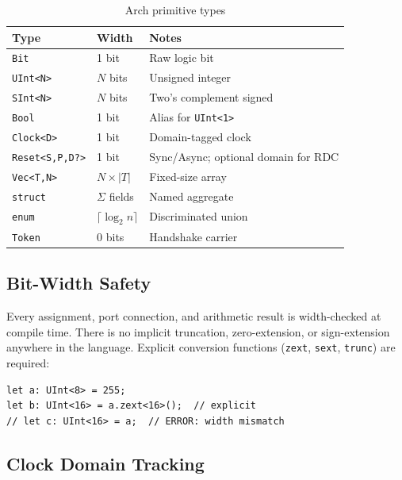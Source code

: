\documentclass[11pt,twocolumn]{article}
\begin{document}
\begin{table}[t]
\centering
\caption{Arch primitive types}
\label{tab:types}
\footnotesize
\begin{tabular}{@{}llp{3.1cm}@{}}
\toprule
\textbf{Type} & \textbf{Width} & \textbf{Notes} \\
\midrule
\texttt{Bit}             & 1 bit & Raw logic bit \\
\texttt{UInt<N>}         & $N$ bits & Unsigned integer \\
\texttt{SInt<N>}         & $N$ bits & Two's complement signed \\
\texttt{Bool}            & 1 bit & Alias for \texttt{UInt<1>} \\
\texttt{Clock<D>}        & 1 bit & Domain-tagged clock \\
\texttt{Reset<S,P,D?>}   & 1 bit & Sync/Async; optional domain for RDC \\
\texttt{Vec<T,N>}        & $N \times |T|$ & Fixed-size array \\
\texttt{struct}          & $\Sigma$ fields & Named aggregate \\
\texttt{enum}            & $\lceil\log_2 n\rceil$ & Discriminated union \\
\texttt{Token}           & 0 bits & Handshake carrier \\
\bottomrule
\end{tabular}
\end{table}

\subsection{Bit-Width Safety}

Every assignment, port connection, and arithmetic result is width-checked at compile time. There is no implicit truncation, zero-extension, or sign-extension anywhere in the language. Explicit conversion functions (\texttt{zext}, \texttt{sext}, \texttt{trunc}) are required:

\begin{lstlisting}[language=Arch,caption={Explicit width conversion},label={lst:width}]
let a: UInt<8> = 255;
let b: UInt<16> = a.zext<16>();  // explicit
// let c: UInt<16> = a;  // ERROR: width mismatch
\end{lstlisting}

\subsection{Clock Domain Tracking}
\end{document}
